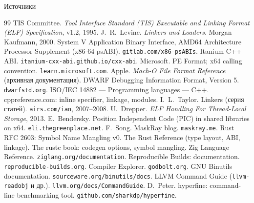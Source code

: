 \documentclass[aspectratio=169,11pt]{beamer}
\begin{document}
\begin{frame}[allowframebreaks]{Источники}
  \small
  \begin{thebibliography}{99}
     TIS Committee. \emph{Tool Interface Standard (TIS) Executable and Linking Format (ELF) Specification}, v1.2, 1995.
     J.~R.~Levine. \emph{Linkers and Loaders}. Morgan Kaufmann, 2000.
     System V Application Binary Interface, AMD64 Architecture Processor Supplement (x86-64 psABI). \texttt{gitlab.com/x86-psABIs}.
     Itanium C++ ABI. \texttt{itanium-cxx-abi.github.io/cxx-abi}.
     Microsoft. PE Format; x64 calling convention. \texttt{learn.microsoft.com}.
     Apple. \emph{Mach-O File Format Reference} (архивная документация).
     DWARF Debugging Information Format, Version 5. \texttt{dwarfstd.org}.
     ISO/IEC 14882 --- Programming languages --- C++.
     cppreference.com: inline specifier, linkage, modules.
     I.~L.~Taylor. Linkers (серия статей). \texttt{airs.com/ian}, 2007--2008.
     U.~Drepper. \emph{ELF Handling For Thread-Local Storage}, 2013.
     E.~Bendersky. Position Independent Code (PIC) in shared libraries on x64. \texttt{eli.thegreenplace.net}.
     F.~Song. MaskRay blog. \texttt{maskray.me}.
     Rust RFC 2603: Symbol Name Mangling v0.
     The Rust Reference (type layout, ABI, linkage).
     The rustc book: codegen options, symbol mangling.
     Zig Language Reference. \texttt{ziglang.org/documentation}.
     Reproducible Builds: documentation. \texttt{reproducible-builds.org}.
     Compiler Explorer. \texttt{godbolt.org}.
     GNU Binutils documentation. \texttt{sourceware.org/binutils/docs}.
     LLVM Command Guide (\texttt{llvm-readobj} и др.). \texttt{llvm.org/docs/CommandGuide}.
     D.~Peter. hyperfine: command-line benchmarking tool. \texttt{github.com/sharkdp/hyperfine}.
  \end{thebibliography}
\end{frame}
\end{document}
